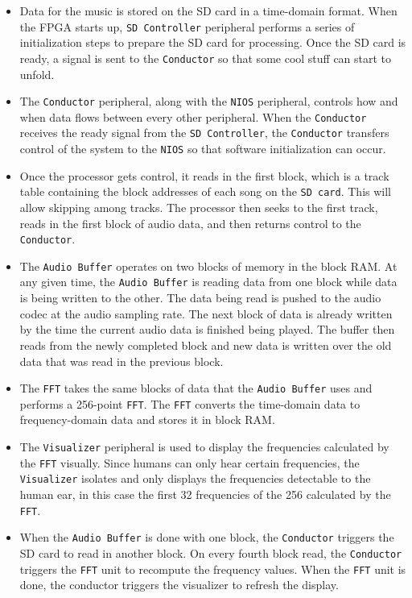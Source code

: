 \documentclass{article}
\begin{document}
\begin{itemize}
	\item Data for the music is stored on the SD card in a time-domain format.
		When the FPGA starts up, \texttt{SD Controller} peripheral performs a 
		series of
		initialization steps to prepare the SD card for processing. Once the 
		SD card is ready, a signal is sent to the \texttt{Conductor} so that some cool 
		stuff can start to unfold.  
	\item The \texttt{Conductor} peripheral, along with the \texttt{NIOS} peripheral,
		controls how and when data flows between every other peripheral. 
		When the \texttt{Conductor} receives the ready signal from the 
		\texttt{SD Controller}, 
		the \texttt{Conductor} transfers control of the system to the \texttt{NIOS} so 
		that 
		software initialization can occur.  
	\item Once the processor gets control, it reads in the first block, which
		is a track table containing the block addresses of each song on the 
		\texttt{SD
		card}. This will allow skipping among tracks. The processor then
		seeks to the first track, reads in the first block of audio data, and
		then returns control to the \texttt{Conductor}.
	\item The \texttt{Audio Buffer} operates on two blocks of memory in the 
		block RAM.
		At any given time, the \texttt{Audio Buffer} is reading data from one block
		while data is being written to the other. The data being read is
		pushed to the audio codec at the audio sampling rate. 
		The next block of data is already written by the time the current audio 
		data is finished being played. The buffer then reads from the newly 
		completed block and new data is written over the old data that was 
		read in the previous block.
	\item The \texttt{FFT} takes the same blocks of data that the \texttt{Audio Buffer} 
		uses
		and performs a 256-point \texttt{FFT}. The \texttt{FFT} converts the 
		time-domain data
		to frequency-domain data and stores it in block RAM.  
	\item The \texttt{Visualizer} peripheral is used to display the frequencies
		calculated by the \texttt{FFT} visually. Since humans can only hear
		certain frequencies, the \texttt{Visualizer} isolates and only displays
		the frequencies detectable to the human ear, in this case the
		first 32 frequencies of the 256 calculated by the \texttt{FFT}.  
	\item When the \texttt{Audio Buffer} is done with one block, the 
		\texttt{Conductor} triggers
		the SD card to read in another block. On every fourth block read, the
		\texttt{Conductor }triggers the \texttt{FFT} unit to recompute the frequency 
		values.
		When the \texttt{FFT} unit is done, the conductor triggers the visualizer to
		refresh the display.
\end{itemize}
\end{document}

